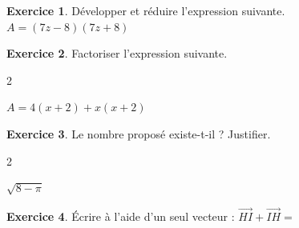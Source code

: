 \documentclass{exam}
\theoremstyle{definition}
\newtheorem{exercice}{Exercice}
\begin{document}
\large


\vspace{2mm}


\vspace{2mm}
\begin{exercice}

Développer et réduire l'expression suivante.
 $A = (7z-8)(7z+8)$
    \begin{center}
        \framebox[1\textwidth]{\parbox{5.5in}{
        \vspace{6em}}}
    \end{center}
\end{exercice}

\begin{exercice}

Factoriser l'expression suivante.\begin{multicols}{2}
 \begin{minipage}[t]{\linewidth} $A = 4(x+2)+x(x+2)$ \end{minipage}
\end{multicols}
    \begin{center}
        \framebox[1\textwidth]{\parbox{4.5in}{
        \vspace{6em}}}
    \end{center}
\end{exercice}

\begin{exercice}

 Le nombre proposé existe-t-il ? Justifier.\begin{multicols}{2}
 \begin{minipage}[t]{\linewidth} $\sqrt{8-\pi}$ \end{minipage}
\end{multicols}
	\framebox[1\textwidth]{\parbox{4.5in}{
	\vspace{6em}}}
\end{exercice}

\begin{exercice} Écrire à l'aide d'un seul vecteur :       $\overrightarrow{HI}+\overrightarrow{IH}=${\makebox[5em]{\enspace\hrulefill}}
\end{exercice}
\end{document}
